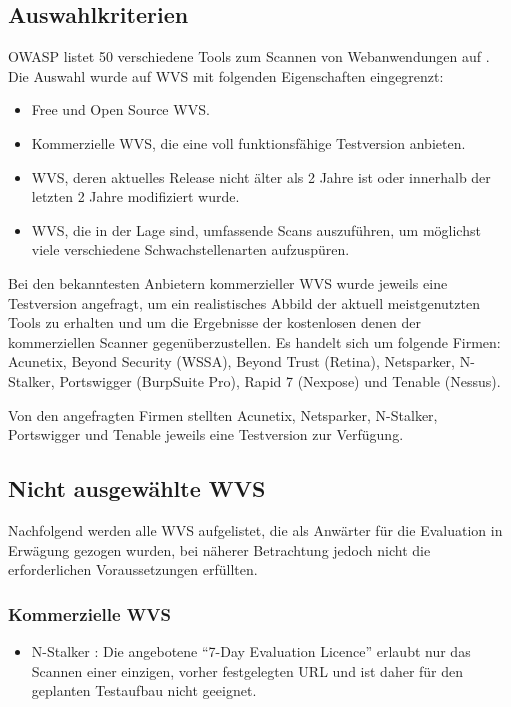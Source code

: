 \documentclass[12pt,oneside,a4paper,parskip,pointlessnumbers]{scrbook}
\begin{document}
  \subsection{Auswahlkriterien}
  OWASP listet 50 verschiedene Tools zum Scannen von Webanwendungen auf
  \cite{OWASPtools}. Die Auswahl wurde auf WVS mit folgenden Eigenschaften eingegrenzt:
  \begin{itemize}
    \item Free und Open Source WVS.
    \item Kommerzielle WVS, die eine voll funktionsfähige Testversion anbieten.
    \item WVS, deren aktuelles Release nicht älter als 2 Jahre ist oder innerhalb der letzten 2 Jahre modifiziert wurde.
    \item WVS, die in der Lage sind, umfassende Scans auszuführen, um möglichst viele verschiedene Schwachstellenarten aufzuspüren.
  \end{itemize}
  Bei den bekanntesten Anbietern kommerzieller WVS wurde jeweils eine Testversion angefragt, um ein realistisches Abbild der aktuell meistgenutzten Tools zu erhalten und um die Ergebnisse der kostenlosen denen der kommerziellen Scanner gegenüberzustellen. Es handelt sich um folgende Firmen:
  \\Acunetix, Beyond Security (WSSA), Beyond Trust (Retina), Netsparker, N-Stalker, Portswigger (BurpSuite Pro), Rapid 7 (Nexpose) und Tenable (Nessus).

  Von den angefragten Firmen stellten Acunetix, Netsparker, N-Stalker, Portswigger und Tenable jeweils eine Testversion zur Verfügung.

  \subsection{Nicht ausgewählte WVS}
    Nachfolgend werden alle WVS aufgelistet, die als Anwärter für die Evaluation in Erwägung gezogen wurden, bei näherer Betrachtung jedoch nicht die erforderlichen Voraussetzungen erfüllten.
    \subsubsection{Kommerzielle WVS}
      \begin{itemize}
        \item N-Stalker \cite{Stalker}: Die angebotene ``7-Day Evaluation Licence'' erlaubt nur das Scannen einer einzigen, vorher festgelegten URL und ist daher für den geplanten Testaufbau nicht geeignet.
      \end{itemize}
\end{document}
